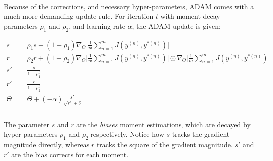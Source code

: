 \documentclass[12pt,letterpaper]{article}
\begin{document}
\paragraph*{}Because of the corrections, and necessary hyper-parameters, ADAM comes with a much more demanding update rule. For iteration $t$ with moment decay parameters $\rho_1$ and $\rho_2$, and learning rate $\alpha$, the ADAM update is given: 

\begin{equation}
\label{ADAM update}
\begin{split}
s &= \rho_1 s + (1 - \rho_1) \nabla_{\Theta} \Big[ \frac{1}{m} \sum_{n=1}^{m} J(y^{(n)},y^{*(n)}) \Big]  \\
r &= \rho_2 r + (1 - \rho_2) \nabla_{\Theta} \Big[ \frac{1}{m} \sum_{n=1}^{m} J(y^{(n)},y^{*(n)}) \Big] \odot
							\nabla_{\Theta} \Big[ \frac{1}{m} \sum_{n=1}^{m} J(y^{(n)},y^{*(n)}) \Big]  \\
s' &= \frac{s}{1-\rho_1^t} \\
r' &= \frac{r}{1-\rho_2^t} \\
\Theta &= \Theta + (-\alpha)\frac{s'}{\sqrt{r'}+\delta} \\
\end{split}
\end{equation}

\paragraph*{}The parameter $s$ and $r$ are the \textit{biases} moment estimations, which are decayed by hyper-parameters $\rho_1$ and $\rho_2$ respectively. Notice how $s$ tracks the gradient magnitude directly, whereas $r$ tracks the square of the gradient magnitude. $s'$ and $r'$ are the bias corrects for each moment.
\end{document}

